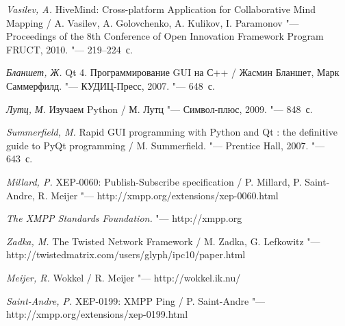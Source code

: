 \newpage
{}
\begin{thebibliography}{99}

\textit {Vasilev, A.}
HiveMind: Cross-platform Application for Collaborative Mind Mapping
/ A. Vasilev, A. Golovchenko, A. Kulikov, I. Paramonov
"--- Proceedings of the 8th Conference of Open Innovation Framework Program
FRUCT, 2010.
"---  219--224~с.

\textit {Бланшет, Ж.} Qt 4. Программирование GUI на С++
/ Жасмин Бланшет, Марк Саммерфилд.
"--- КУДИЦ-Пресс, 2007.
"--- 648~с.

\textit {Лутц, М.} Изучаем Python
/ М. Лутц
"--- Символ-плюс, 2009.
"--- 848~с.

\textit {Summerfield, M.} Rapid GUI programming with Python and Qt : the
definitive guide to PyQt programming
/ M. Summerfield.
"--- Prentice Hall, 2007.
"--- 643~с.

\textit {Millard, P.}  XEP-0060: Publish-Subscribe specification
/ P. Millard, P. Saint-Andre, R. Meijer
"---  http://xmpp.org/extensions/xep-0060.html

\textit {The XMPP Standards Foundation.}
"--- http://xmpp.org

\textit {Zadka, M.} The Twisted Network Framework
/ M. Zadka, G. Lefkowitz
"--- http://twistedmatrix.com/users/glyph/ipc10/paper.html

\textit {Meijer, R.} Wokkel
/ R. Meijer
"--- http://wokkel.ik.nu/

\textit{Saint-Andre, P.} XEP-0199: XMPP Ping
/ P. Saint-Andre
"--- http://xmpp.org/extensions/xep-0199.html

\end{thebibliography}